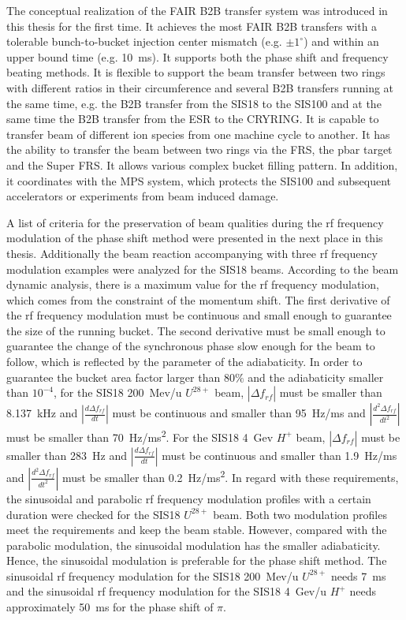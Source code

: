 
The conceptual realization of the FAIR B2B transfer system was introduced in this thesis for the first time. It achieves the most FAIR B2B transfers with a tolerable bunch-to-bucket injection center mismatch (e.g. $\pm 1^\circ$) and within an upper bound time (e.g. \SI{10}{\ms}). It supports both the phase shift and frequency beating methods. It is flexible to support the beam transfer between two rings with different ratios in their circumference and several B2B transfers running at the same time, e.g. the B2B transfer from the SIS18 to the SIS100 and at the same time the B2B transfer from the ESR to the CRYRING. It is capable to transfer beam of different ion species from one machine cycle to another. It has the ability to transfer the beam between two rings via the FRS, the pbar target and the Super FRS. It allows various complex bucket filling pattern. In addition, it coordinates with the MPS system, which protects the SIS100 and subsequent accelerators or experiments from beam induced damage. 

A list of criteria for the preservation of beam qualities during the rf frequency modulation of the phase shift method were presented in the next place in this thesis. Additionally the beam reaction accompanying with three rf frequency modulation examples were analyzed for the SIS18 beams. According to the beam dynamic analysis, there is a maximum value for the rf frequency modulation, which comes from the constraint of the momentum shift. The first derivative of the rf frequency modulation must be continuous and small enough to guarantee the size of the running bucket. The second derivative must be small enough to guarantee the change of the synchronous phase slow enough for the beam to follow, which is reflected by the parameter of the adiabaticity. In order to guarantee the bucket area factor larger than $80\%$ and the adiabaticity smaller than $10^{-4}$, for the SIS18 \SI{200}{Mev/u} $U^{28+}$ beam, $|\Delta f_{\mathit{rf}}|$ must be smaller than \SI{8.137}{kHz} and $|\frac{d\Delta f_{\mathit{rf}}}{dt}|$ must be continuous and smaller than \SI{95}{Hz/ms} and $|\frac{d^2\Delta f_{\mathit{rf}}}{dt^2}|$ must be smaller than \SI{70}{Hz/ms^2}. For the SIS18 \SI{4}{Gev} $H^{+}$ beam, $|\Delta f_{\mathit{rf}}|$ must be smaller than \SI{283}{Hz} and $|\frac{d\Delta f_{\mathit{rf}}}{dt}|$ must be continuous and smaller than \SI{1.9}{Hz/ms} and $|\frac{d^2\Delta f_{\mathit{rf}}}{dt^2}|$ must be smaller than \SI{0.2}{Hz/ms^2}.  In regard with these requirements, the sinusoidal and parabolic rf frequency modulation profiles with a certain duration were checked for the SIS18 $U^{28+}$ beam. Both two modulation profiles meet the requirements and keep the beam stable. However, compared with the parabolic modulation, the sinusoidal modulation has the smaller adiabaticity. Hence, the sinusoidal modulation is preferable for the phase shift method. The sinusoidal rf frequency modulation for the SIS18 \SI{200}{Mev/u} $U^{28+}$ needs \SI{7}{\ms} and the sinusoidal rf frequency modulation for the SIS18 \SI{4}{Gev/u} $H^{+}$ needs approximately \SI{50}{\ms} for the phase shift of $\pi$. 

